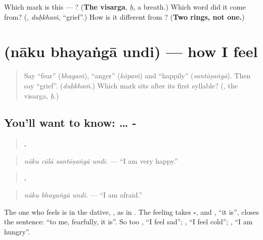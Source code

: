 \begin{tcolorbox}[breakable,colback=teal!4,colframe=teal!35!black,title={Before you move on}]
Which mark is this — ? (\textbf{The visarga}, \emph{ḥ}, a breath.) Which word did it come from? (\textbf{}, \emph{duḥkhaṁ}, \textquotedblleft{}grief\textquotedblright{}.) How is it different from \textbf{}? (\textbf{Two rings, not one.})
\end{tcolorbox}
\section[\texorpdfstring{\te{నాకు} \te{భయంగా} \te{ఉంది} (nāku bhayaṅgā undi)}{నాకు భయంగా ఉంది (nāku bhayaṅgā undi)}]{   (nāku bhayaṅgā undi) — how I feel}

\label{lesson:TE-C322-bhayanga-undi}



\begin{quote}
Say \textquotedblleft{}fear\textquotedblright{} (\emph{bhayaṁ}), \textquotedblleft{}anger\textquotedblright{} (\emph{kōpaṁ}) and \textquotedblleft{}happily\textquotedblright{} (\emph{santōṣaṅgā}). Then say \textquotedblleft{}grief\textquotedblright{}. (\emph{duḥkhaṁ}.) Which mark sits after its first syllable? (\textbf{}, the visarga, \emph{ḥ}.)
\end{quote}

\subsection*{You'll want to know:  … - }
\begin{quote}
\textbf{   .}
\end{quote}

\begin{quote}
\emph{nāku cālā santōṣaṅgā undi.} — \textquotedblleft{}I am very happy.\textquotedblright{}
\end{quote}

\begin{quote}
\textbf{  .}
\end{quote}

\begin{quote}
\emph{nāku bhayaṅgā undi.} — \textquotedblleft{}I am afraid.\textquotedblright{}
\end{quote}

The one who feels is in the dative, \textbf{}, as in \textbf{  }. The feeling takes \textbf{-}, and \textbf{}, \textquotedblleft{}it is\textquotedblright{}, closes the sentence: \textquotedblleft{}to me, fearfully, it is\textquotedblright{}. So too \textbf{  }, \textquotedblleft{}I feel sad\textquotedblright{}; \textbf{  }, \textquotedblleft{}I feel cold\textquotedblright{}; \textbf{  }, \textquotedblleft{}I am hungry\textquotedblright{}.

